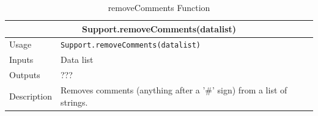 \documentclass{llncs}
\numberwithin{algorithm}{chapter}
\begin{document}
\begin{table}[H]
\caption{removeComments Function}
\begin{tabular}{ |p{2cm}||p{11cm}|  }
 \hline
 \multicolumn{2}{|c|}{\cellcolor{teal}\textbf{Support.removeComments(datalist)}} \\
 \hline
 Usage & \texttt{Support.removeComments(datalist)}\\ \hline
 Inputs & Data list \\ \hline
 Outputs &  ???  \\ \hline
 Description & Removes comments (anything after a '\#' sign) from a list of strings. \\ \hline
\end{tabular}
\end{table}
\end{document}

